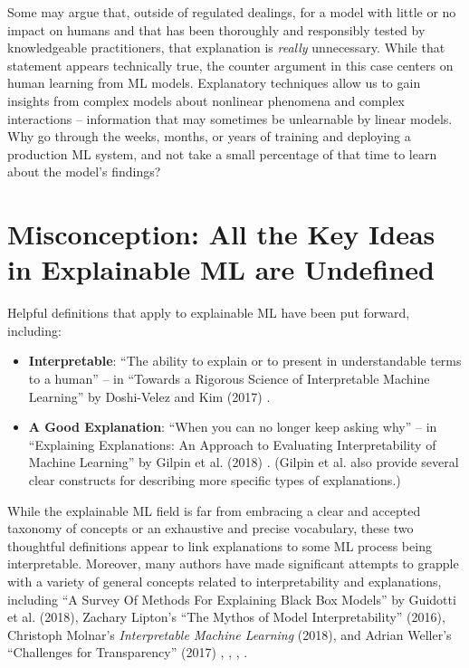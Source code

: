 \documentclass[fleqn]{article}
\begin{document}
Some may argue that, outside of regulated dealings, for a model with little or no impact on humans and that has been thoroughly and responsibly tested by knowledgeable practitioners, that explanation is \textit{really} unnecessary. While that statement appears technically true, the counter argument in this case centers on human learning from ML models. Explanatory techniques allow us to gain insights from complex models about nonlinear phenomena and complex interactions -- information that may sometimes be unlearnable by linear models. Why go through the weeks, months, or years of training and deploying a production ML system, and not take a small percentage of that time to learn about the model's findings?\\ 

\section{Misconception: All the Key Ideas in Explainable ML are Undefined}

Helpful definitions that apply to explainable ML have been put forward, including:

\begin{itemize}
\item \textbf{Interpretable}: ``The ability to explain or to present in understandable terms to a human'' -- in ``Towards a Rigorous Science of Interpretable Machine Learning'' by Doshi-Velez and Kim (2017) \cite{been_kim1}.
\item \textbf{A Good Explanation}: ``When you can no longer keep asking why'' -- in ``Explaining Explanations: An Approach to Evaluating Interpretability of Machine Learning'' by Gilpin et al. (2018) \cite{gilpin2018explaining}. (Gilpin et al. also provide several clear constructs for describing more specific types of explanations.) 
\end{itemize}

While the explainable ML field is far from embracing a clear and accepted taxonomy of concepts or an exhaustive and precise vocabulary, these two thoughtful definitions appear to link explanations to some ML process being interpretable. Moreover, many authors have made significant attempts to grapple with a variety of general concepts related to interpretability and explanations, including ``A Survey Of Methods For Explaining Black Box Models'' by Guidotti et al. (2018), Zachary Lipton's ``The Mythos of Model Interpretability'' (2016), Christoph Molnar's \textit{Interpretable Machine Learning} (2018), and Adrian Weller's ``Challenges for Transparency'' (2017) \cite{guidotti2018survey},  \cite{lipton1}, \cite{molnar}, \cite{weller2017challenges}.\\ 
\end{document}
